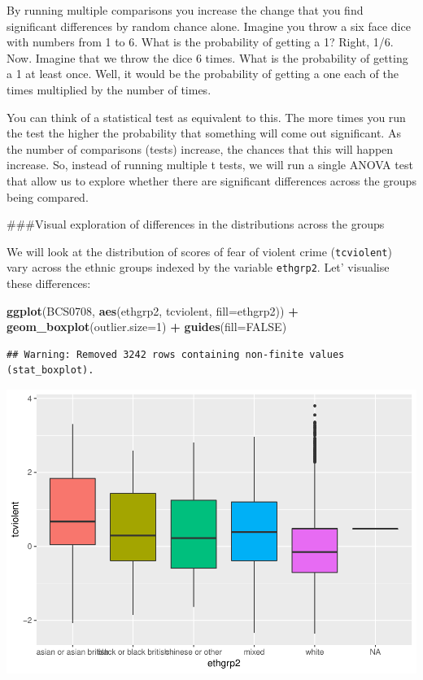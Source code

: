 \documentclass[]{book}
\newenvironment{Shaded}{\begin{snugshade}}{\end{snugshade}}
\newcommand{\DataTypeTok}[1]{\textcolor[rgb]{0.13,0.29,0.53}{#1}}
\newcommand{\DecValTok}[1]{\textcolor[rgb]{0.00,0.00,0.81}{#1}}
\newcommand{\KeywordTok}[1]{\textcolor[rgb]{0.13,0.29,0.53}{\textbf{#1}}}
\newcommand{\NormalTok}[1]{#1}
\newcommand{\OperatorTok}[1]{\textcolor[rgb]{0.81,0.36,0.00}{\textbf{#1}}}
\newcommand{\OtherTok}[1]{\textcolor[rgb]{0.56,0.35,0.01}{#1}}
\newcommand{\StringTok}[1]{\textcolor[rgb]{0.31,0.60,0.02}{#1}}
\theoremstyle{definition}
\theoremstyle{definition}
\theoremstyle{definition}
\theoremstyle{remark}
\begin{document}
By running multiple comparisons you increase the change that you find
significant differences by random chance alone. Imagine you throw a six
face dice with numbers from 1 to 6. What is the probability of getting a
1? Right, 1/6. Now. Imagine that we throw the dice 6 times. What is the
probability of getting a 1 at least once. Well, it would be the
probability of getting a one each of the times multiplied by the number
of times.

You can think of a statistical test as equivalent to this. The more
times you run the test the higher the probability that something will
come out significant. As the number of comparisons (tests) increase, the
chances that this will happen increase. So, instead of running multiple
t tests, we will run a single ANOVA test that allow us to explore
whether there are significant differences across the groups being
compared.

\#\#\#Visual exploration of differences in the distributions across the
groups

We will look at the distribution of scores of fear of violent crime
(\texttt{tcviolent}) vary across the ethnic groups indexed by the
variable \texttt{ethgrp2}. Let' visualise these differences:

\begin{Shaded}
\begin{Highlighting}[]
\KeywordTok{ggplot}\NormalTok{(BCS0708, }\KeywordTok{aes}\NormalTok{(ethgrp2, tcviolent, }\DataTypeTok{fill=}\NormalTok{ethgrp2)) }\OperatorTok{+}\StringTok{ }
\StringTok{  }\KeywordTok{geom_boxplot}\NormalTok{(}\DataTypeTok{outlier.size=}\DecValTok{1}\NormalTok{) }\OperatorTok{+}\StringTok{ }
\StringTok{  }\KeywordTok{guides}\NormalTok{(}\DataTypeTok{fill=}\OtherTok{FALSE}\NormalTok{) }
\end{Highlighting}
\end{Shaded}

\begin{verbatim}
## Warning: Removed 3242 rows containing non-finite values (stat_boxplot).
\end{verbatim}

\includegraphics{06-hypothesis_testing_files/figure-latex/unnamed-chunk-5-1.pdf}
\end{document}
